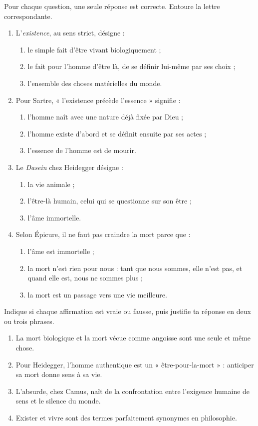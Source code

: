 \documentclass[11pt]{article}
\begin{document}
\begin{exercice}
Pour chaque question, une seule réponse est correcte. Entoure la lettre correspondante.
\begin{enumerate}
\item L'\emph{existence}, au sens strict, désigne :
\begin{enumerate}
\item[a)] le simple fait d'être vivant biologiquement ;
\item[b)] le fait pour l'homme d'être là, de se définir lui-même par ses choix ;
\item[c)] l'ensemble des choses matérielles du monde.
\end{enumerate}
\item Pour Sartre, « l'existence précède l'essence » signifie :
\begin{enumerate}
\item[a)] l'homme naît avec une nature déjà fixée par Dieu ;
\item[b)] l'homme existe d'abord et se définit ensuite par ses actes ;
\item[c)] l'essence de l'homme est de mourir.
\end{enumerate}
\item Le \emph{Dasein} chez Heidegger désigne :
\begin{enumerate}
\item[a)] la vie animale ;
\item[b)] l'être-là humain, celui qui se questionne sur son être ;
\item[c)] l'âme immortelle.
\end{enumerate}
\item Selon Épicure, il ne faut pas craindre la mort parce que :
\begin{enumerate}
\item[a)] l'âme est immortelle ;
\item[b)] la mort n'est rien pour nous : tant que nous sommes, elle n'est pas, et quand elle est, nous ne sommes plus ;
\item[c)] la mort est un passage vers une vie meilleure.
\end{enumerate}
\end{enumerate}
\end{exercice}

\begin{exercice}
Indique si chaque affirmation est vraie ou fausse, puis justifie ta réponse en deux ou trois phrases.
\begin{enumerate}
\item La mort biologique et la mort vécue comme angoisse sont une seule et même chose.
\item Pour Heidegger, l'homme authentique est un « être-pour-la-mort » : anticiper sa mort donne sens à sa vie.
\item L'absurde, chez Camus, naît de la confrontation entre l'exigence humaine de sens et le silence du monde.
\item Exister et vivre sont des termes parfaitement synonymes en philosophie.
\end{enumerate}
\end{exercice}
\end{document}
